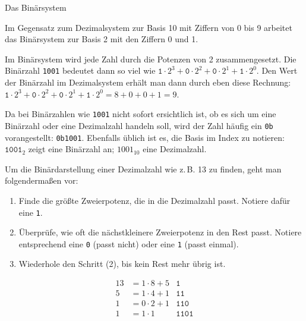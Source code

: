 \medskip
\begin{zsfg}{Das Binärsystem}
	
	Im Gegensatz zum Dezimalsystem zur Basis 10 mit Ziffern von 0 bis 9 arbeitet das Binärsystem zur Basis 2 mit den Ziffern 0 und 1.
	
	Im Binärsystem wird jede Zahl durch die Potenzen von 2 zusammengesetzt. Die Binärzahl \texttt{1001} bedeutet dann so viel wie $\texttt{1}\cdot 2^3 + \texttt{0}\cdot 2^2+ \texttt{0}\cdot 2^1 + \texttt{1}\cdot 2^0$. Den Wert der Binärzahl im Dezimalsystem erhält man dann durch eben diese Rechnung: $\texttt{1}\cdot 2^3 + \texttt{0}\cdot 2^2+ \texttt{0}\cdot 2^1 + \texttt{1}\cdot 2^0= 8 + 0 + 0 + 1 = 9$.
	
	Da bei Binärzahlen wie \texttt{1001} nicht sofort ersichtlich ist, ob es sich um eine Binärzahl oder eine Dezimalzahl handeln soll, wird der Zahl häufig ein \texttt{0b} vorangestellt: \texttt{0b1001}. Ebenfalls üblich ist es, die Basis im Index zu notieren: $\texttt{1001}_{2}$ zeigt eine Binärzahl an; $1001_{10}$ eine Dezimalzahl.
	
	Um die Binärdarstellung einer Dezimalzahl wie z.\,B. 13 zu finden, geht man folgendermaßen vor:
	
	\begin{minipage}{0.65\textwidth}
		\begin{enumerate}[noitemsep]
			\item Finde die größte Zweierpotenz, die in die Dezimalzahl passt. Notiere dafür eine \texttt{1}.
			\item Überprüfe, wie oft die nächstkleinere Zweierpotenz in den Rest passt. Notiere entsprechend eine \texttt{0} (passt nicht) oder eine \texttt{1} (passt einmal).
			\item Wiederhole den Schritt (2), bis kein Rest mehr übrig ist.
		\end{enumerate}
	\end{minipage}
	\hfill
	\begin{minipage}{0.34\textwidth}
		\begin{align*}
			13 &= 1\cdot 8 + 5 & \texttt{1~~~} \\
			5 &= 1\cdot 4 + 1 & \texttt{11~~} \\
			1 &= 0\cdot 2 +1 & \texttt{110~} \\
			1&= 1\cdot 1 & \texttt{1101} 
		\end{align*}
		\vspace{1\baselineskip}
	\end{minipage}
	\vspace{-\baselineskip}
\end{zsfg}

